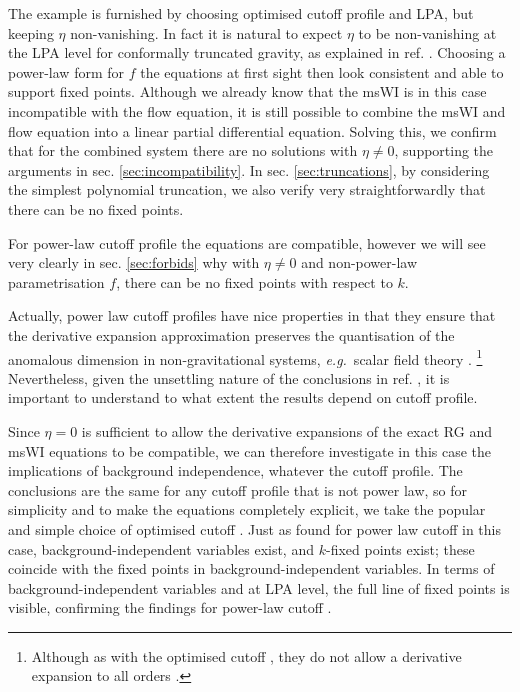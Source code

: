 \documentclass[11pt]{book} %
\newcommand\eg{\textit{e.g.}\ }
\begin{document}
The example is furnished by choosing optimised cutoff profile and LPA, but keeping $\eta$ non-vanishing.
In fact it is natural to expect $\eta$ to be non-vanishing at the LPA level for conformally truncated gravity, as explained in ref. \cite{Dietz:2016gzg}.  Choosing a power-law form for $f$ the equations at first sight then look consistent and able to support fixed points. Although we already know that the msWI is in this case incompatible with the flow equation, it is still possible to combine the msWI and flow equation into a linear partial differential equation. Solving this, we confirm that for the combined system there are no solutions with $\eta\ne0$, supporting the arguments in sec. \ref{sec:incompatibility}. In sec. \ref{sec:truncations}, by considering the simplest polynomial truncation, we also verify very straightforwardly that there can be no fixed points.

For power-law cutoff profile the equations are compatible, however we will see very clearly in sec. \ref{sec:forbids} why with $\eta\ne0$ and non-power-law parametrisation $f$, there can be no fixed points with respect to $k$.

Actually, power law cutoff profiles have nice properties in  that they ensure that the derivative expansion approximation preserves the quantisation of the anomalous dimension in non-gravitational systems,
\eg scalar field theory
\cite{Morris:1994ie, Morris:1994jc, Morris:1998da}.%
\footnote{Although as with the optimised cutoff \cite{Litim:2000ci, Litim:2001fd},
they do not allow a derivative expansion to all orders \cite{Morris:2005ck, Morris:1999ba, Morris:2000hm}.
}
Nevertheless, given the unsettling nature of the conclusions in ref.
\cite{Dietz:2015owa}, it is important to understand  to what extent the results depend on cutoff profile.

Since $\eta=0$ is sufficient to allow the derivative expansions of the exact RG and msWI equations to be compatible, we can therefore investigate in this case the implications of background independence, whatever the cutoff profile. The conclusions are the same for any cutoff profile that is not power law, so for simplicity and to make the equations completely explicit, we take the popular and simple choice of optimised cutoff \cite{Litim:2000ci, Litim:2001fd}.  Just as found for power law cutoff \cite{Dietz:2016gzg} in this case, background-independent variables exist, and $k$-fixed points exist; these coincide with the fixed points in background-independent variables.  In terms of background-independent variables and at LPA level, the full line of fixed points
is visible, confirming the findings for power-law cutoff \cite{Dietz:2016gzg}.
\end{document}

